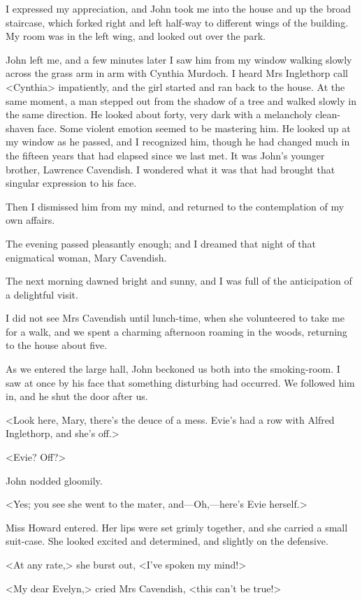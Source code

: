  I expressed my appreciation, and John took me into the house and up the broad staircase, which forked right and left half-way to different wings of the building. My room was in the left wing, and looked out over the park. 

 John left me, and a few minutes later I saw him from my window walking slowly across the grass arm in arm with Cynthia Murdoch. I heard Mrs Inglethorp call <Cynthia> impatiently, and the girl started and ran back to the house. At the same moment, a man stepped out from the shadow of a tree and walked slowly in the same direction. He looked about forty, very dark with a melancholy clean-shaven face. Some violent emotion seemed to be mastering him. He looked up at my window as he passed, and I recognized him, though he had changed much in the fifteen years that had elapsed since we last met. It was John's younger brother, Lawrence Cavendish. I wondered what it was that had brought that singular expression to his face. 

 Then I dismissed him from my mind, and returned to the contemplation of my own affairs. 

 The evening passed pleasantly enough; and I dreamed that night of that enigmatical woman, Mary Cavendish. 

 The next morning dawned bright and sunny, and I was full of the anticipation of a delightful visit. 

 I did not see Mrs Cavendish until lunch-time, when she volunteered to take me for a walk, and we spent a charming afternoon roaming in the woods, returning to the house about five. 

 As we entered the large hall, John beckoned us both into the smoking-room. I saw at once by his face that something disturbing had occurred. We followed him in, and he shut the door after us. 

 <Look here, Mary, there's the deuce of a mess. Evie's had a row with Alfred Inglethorp, and she's off.> 

 <Evie? Off?> 

 John nodded gloomily. 

 <Yes; you see she went to the mater, and—Oh,—here's Evie herself.> 

 Miss Howard entered. Her lips were set grimly together, and she carried a small suit-case. She looked excited and determined, and slightly on the defensive. 

 <At any rate,> she burst out, <I've spoken my mind!> 

 <My dear Evelyn,> cried Mrs Cavendish, <this can't be true!> 

